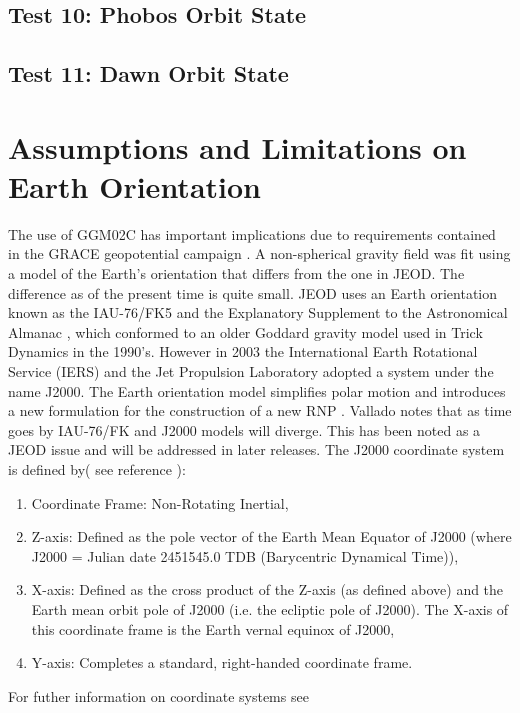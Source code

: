 \newpage
\section {Test 10: Phobos Orbit State}\label{tbl:phobos}


\newpage
\section {Test 11: Dawn Orbit State}\label{tbl:dawn}



\chapter{Assumptions and Limitations on Earth Orientation}\label{ap:eartho}
The use of GGM02C has important implications due to requirements contained in the GRACE geopotential campaign \cite{grace}. A non-spherical gravity field was fit using a model of the Earth's orientation that differs from the one in JEOD. The difference as of the present time is quite small. JEOD uses an Earth orientation known as the IAU-76/FK5 \cite{Bond1} and the Explanatory Supplement to the Astronomical Almanac \cite{ES1}, which conformed to an older Goddard gravity model used in Trick Dynamics in the 1990's. However in 2003 the International Earth Rotational Service (IERS) and the Jet Propulsion Laboratory adopted a system under the name J2000. The Earth orientation model simplifies polar motion and introduces a new formulation for the construction of a new RNP \cite{IERS2003}. Vallado \cite{VMcC} notes that as time goes by IAU-76/FK and J2000 models will diverge. This has been noted as a JEOD issue and will be addressed in later releases. The J2000 coordinate system is defined by( see reference \cite{IERS2003}):
\begin{enumerate}
\item Coordinate Frame: Non-Rotating Inertial,
\item Z-axis: Defined as the pole vector of the Earth Mean Equator of J2000 (where J2000 = Julian date 2451545.0 TDB (Barycentric Dynamical Time)),
\item X-axis: Defined as the cross product of the Z-axis (as defined above) and the Earth mean orbit pole of J2000 (i.e. the ecliptic pole of J2000). The X-axis of this coordinate frame is the Earth vernal equinox of J2000,
\item Y-axis: Completes a standard, right-handed coordinate frame.
\end{enumerate}
For futher information on coordinate systems see \COORDLINK

